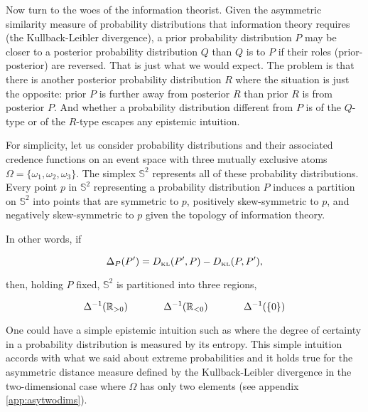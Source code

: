 \documentclass[11pt]{article}
\begin{document}
Now turn to the woes of the information theorist. Given the asymmetric
similarity measure of probability distributions that information
theory requires (the Kullback-Leibler divergence), a prior probability
distribution $P$ may be closer to a posterior probability distribution
$Q$ than $Q$ is to $P$ if their roles (prior-posterior) are reversed.
That is just what we would expect. The problem is that there is
another posterior probability distribution $R$ where the situation is
just the opposite: prior $P$ is further away from posterior $R$ than
prior $R$ is from posterior $P$. And whether a probability
distribution different from $P$ is of the $Q$-type or of the $R$-type
escapes any epistemic intuition.

For simplicity, let us consider probability distributions and their
associated credence functions on an event space with three mutually
exclusive atoms $\Omega=\{\omega_{1},\omega_{2},\omega_{3}\}$. The
simplex $\mathbb{S}^{2}$ represents all of these probability
distributions. Every point $p$ in $\mathbb{S}^{2}$ representing a
probability distribution $P$ induces a partition on $\mathbb{S}^{2}$
into points that are symmetric to $p$, positively skew-symmetric to
$p$, and negatively skew-symmetric to $p$ given the topology of
information theory.

In other words, if

\begin{equation}
  \label{eq:sksy}
  \Delta_{P}(P')=D_{\mbox{\tiny KL}}(P',P)-D_{\mbox{\tiny KL}}(P,P'),
\end{equation}

then, holding $P$ fixed, $\mathbb{S}^{2}$ is partitioned into three
regions, 

\begin{equation}
  \label{eq:sieruxis}
  \Delta^{-1}(\mathbb{R}_{>0})\hspace{.5in}\Delta^{-1}(\mathbb{R}_{<0})\hspace{.5in}\Delta^{-1}(\{0\})
\end{equation}

One could have a simple epistemic intuition such as 
where the degree of certainty in a probability distribution is
measured by its entropy. This simple intuition accords with what we
said about extreme probabilities and it holds true for the asymmetric
distance measure defined by the Kullback-Leibler divergence in the
two-dimensional case where $\Omega$ has only two elements (see
appendix \ref{app:asytwodims}).
\end{document}
